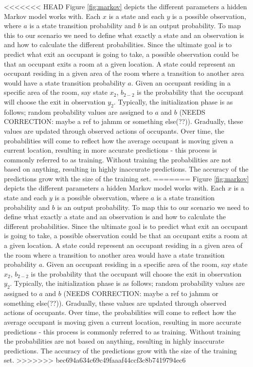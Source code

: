 <<<<<<< HEAD
Figure \ref{fig:markov} depicts the different parameters a hidden Markov model works with. Each \(x\) is a state and each \(y\) is a possible observation, where \(a\) is a state transition probability and \(b\) is an output probability. To map this to our scenario we need to define what exactly a state and an observation is and how to calculate the different probabilities. Since the ultimate goal is to predict what exit an occupant is going to take, a possible observation could be that an occupant exits a room at a given location. A state could represent an occupant residing in a given area of the room where a transition to another area would have a state transition probability \(a\). Given an occupant residing in a specific area of the room, say state \(x_2\), \(b_{2-2}\) is the probability that the occupant will choose the exit in observation \(y_2\). Typically, the initialization phase is as follows; random probability values are assigned to \(a\) and \(b\) (NEEDS CORRECTION: maybe a ref to jahmm or something else(??)). Gradually, these values are updated through observed actions of occupants. Over time, the probabilities will come to reflect how the average occupant is moving given a current location, resulting in more accurate predictions - this process is commonly referred to as training. Without training the probabilities are not based on anything, resulting in highly inaccurate predictions. The accuracy of the predictions grow with the size of the training set.
=======
Figure \ref{fig:markov} depicts the different parameters a hidden Markov model works with. Each \(x\) is a state and each \(y\) is a possible observation, where \(a\) is a state transition probability and \(b\) is an output probability. To map this to our scenario we need to define what exactly a state and an observation is and how to calculate the different probabilities. Since the ultimate goal is to predict what exit an occupant is going to take, a possible observation could be that an occupant exits a room at a given location. A state could represent an occupant residing in a given area of the room where a transition to another area would have a state transition probability \(a\). Given an occupant residing in a specific area of the room, say state \(x_2\), \(b_{2-2}\) is the probability that the occupant will choose the exit in observation \(y_2\). Typically, the initialization phase is as follows; random probability values are assigned to \(a\) and \(b\) (NEEDS CORRECTION: maybe a ref to jahmm or something else(??)). Gradually, these values are updated through observed actions of occupants. Over time, the probabilities will come to reflect how the average occupant is moving given a current location, resulting in more accurate predictions - this process is commonly referred to as training. Without training the probabilities are not based on anything, resulting in highly inaccurate predictions. The accuracy of the predictions grow with the size of the training set. 
>>>>>>> bec694a634c69c49faaaf44ccf3c8b7419794ec6

